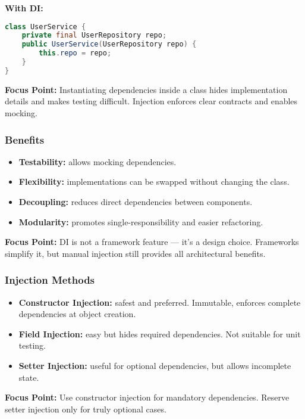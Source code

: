 \documentclass[a4paper,12pt]{article}
\begin{document}
\textbf{With DI:}
\begin{lstlisting}[language=Java]
class UserService {
    private final UserRepository repo;
    public UserService(UserRepository repo) {
        this.repo = repo;
    }
}
\end{lstlisting}

\textbf{Focus Point:} Instantiating dependencies inside a class hides implementation details and makes testing difficult. Injection enforces clear contracts and enables mocking.

\subsubsection{Benefits}

\begin{itemize}
  \item \textbf{Testability:} allows mocking dependencies.
  \item \textbf{Flexibility:} implementations can be swapped without changing the class.
  \item \textbf{Decoupling:} reduces direct dependencies between components.
  \item \textbf{Modularity:} promotes single-responsibility and easier refactoring.
\end{itemize}

\textbf{Focus Point:} DI is not a framework feature — it's a design choice. Frameworks simplify it, but manual injection still provides all architectural benefits.

\subsubsection{Injection Methods}

\begin{itemize}
  \item \textbf{Constructor Injection:} safest and preferred. Immutable, enforces complete dependencies at object creation.
  \item \textbf{Field Injection:} easy but hides required dependencies. Not suitable for unit testing.
  \item \textbf{Setter Injection:} useful for optional dependencies, but allows incomplete state.
\end{itemize}

\textbf{Focus Point:} Use constructor injection for mandatory dependencies. Reserve setter injection only for truly optional cases.
\end{document}
